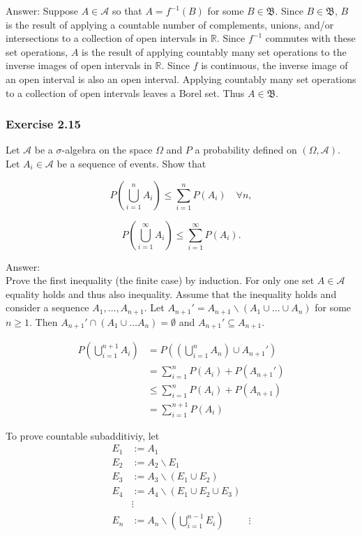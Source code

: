 \documentclass{article}
\begin{document}
Answer: Suppose $A \in \mathcal{A}$ so that $A = f^{-1}(B)$ for some $B \in \mathfrak{B}$. Since $B \in \mathfrak{B}$, $B$ is the result of applying a countable number of complements, unions, and/or intersections to a collection of open intervals in $\mathbb{R}$. Since $f^{-1}$ commutes with these set operations, $A$ is the result of applying countably many set operations to the inverse images of open intervals in $\mathbb{R}$. Since $f$ is continuous, the inverse image of an open interval is also an open interval. Applying countably many set operations to a collection of open intervals leaves a Borel set. Thus $A \in \mathfrak{B}$.
\subsubsection*{Exercise 2.15}

Let $\mathcal{A}$ be a $\sigma$-algebra on the space $\Omega$ and $P$ a probability defined on $(\Omega, \mathcal{A})$. Let $A_i \in \mathcal{A}$ be a sequence of events. Show that

$$
P\left(\bigcup_{i=1}^n A_i \right) \leq \sum_{i = 1}^n P(A_i) \quad \forall n,
$$

$$
P\left(\bigcup_{i=1}^\infty A_i \right) \leq \sum_{i = 1}^\infty P(A_i).
$$

Answer:\\

Prove the first inequality (the finite case) by induction. For only one set $A \in \mathcal{A}$ equality holds and thus also inequality. Assume that the inequality holds and consider a sequence $A_1, \dots , A_{n+1}$. Let $A_{n+1}' = A_{n+1} \backslash (A_1 \cup \dots \cup A_{n})$ for some $n \geq 1$. Then $A_{n+1}' \cap (A_1 \cup \dots A_n) = \emptyset$ and $A_{n+1}' \subseteq A_{n+1}$.

\begin{align*}
P\left(\bigcup_{i=1}^{n+1} A_i \right)
&= P\left(\left(\bigcup_{i=1}^n A_n \right) \cup A_{n+1}' \right) \\
&= \sum_{i = 1}^n P(A_i) + P(A_{n+1}') \\
&\leq \sum_{i = 1}^n P(A_i) + P(A_{n+1}) \\
&= \sum_{i = 1}^{n+1} P(A_i)
\end{align*}

To prove countable subadditiviy, let
\begin{align*}
E_1 &:= A_1 \\
E_2 &:= A_2 \backslash  E_1 \\
E_3 &:= A_3 \backslash (E_1 \cup E_2) \\
E_4 &:= A_4 \backslash (E_1 \cup E_2 \cup E_3) \\
&\vdots \\
E_n &:= A_n \backslash \left(\bigcup_{i=1}^{n-1} E_i \right)
&\vdots 
\end{align*}
\end{document}
